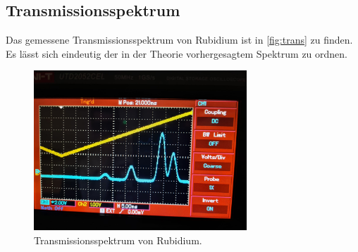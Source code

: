 \subsection{Transmissionsspektrum}
\label{sec:trans}
Das gemessene Transmissionsspektrum von Rubidium ist in \autoref{fig:trans} zu finden. Es lässt sich eindeutig
der in der Theorie vorhergesagtem Spektrum zu ordnen.
\begin{figure}
    \centering
    \includegraphics[height=6cm]{content/pics/5.jpg}
    \caption{Transmissionsspektrum von Rubidium.}
    \label{fig:lum}
\end{figure}